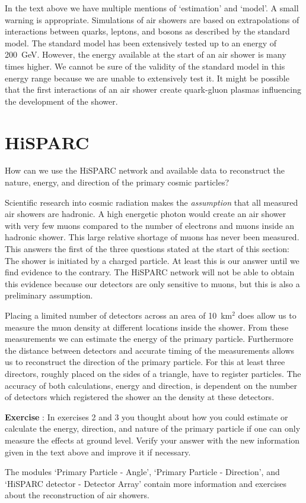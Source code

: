 In the text above we have multiple mentions of `estimation' and `model'. A small warning is appropriate. Simulations of air showers are based on extrapolations of interactions between quarks, leptons, and bosons as described by the standard model. The standard model has been extensively tested up to an energy of 200~GeV. However, the energy available at the start of an air shower is many times higher. We cannot be sure of the validity of the standard model in this energy range because we are unable to extensively test it. It might be possible that the first interactions of an air shower create quark-gluon plasmas influencing the development of the shower.

\section{HiSPARC}
How can we use the HiSPARC network and available data to reconstruct the nature, energy, and direction of the primary cosmic particles?

Scientific research into cosmic radiation makes the \emph{assumption} that all measured air showers are hadronic. A high energetic photon would create an air shower with very few muons compared to the number of electrons and muons inside an hadronic shower. This large relative shortage of muons has never been measured. This answers the first of the three questions stated at the start of this section: The shower is initiated by a charged particle. At least this is our answer until we find evidence to the contrary. The HiSPARC network will not be able to obtain this evidence because our detectors are only sensitive to muons, but this is also a preliminary assumption.

Placing a limited number of detectors across an area of 10~km$^2$ does allow us to measure the muon density at different locations inside the shower. From these measurements we can estimate the energy of the primary particle. Furthermore the distance between detectors and accurate timing of the measurements allows us to reconstruct the direction of the primary particle. For this at least three directors, roughly placed on the sides of a triangle, have to register particles. The accuracy of both calculations, energy and direction, is dependent on the number of detectors which registered the shower an the density at these detectors.

\begin{shaded}
\textbf{Exercise \theExercise {}} : In exercises 2 and 3 you thought about how you could estimate or calculate the energy, direction, and nature of the primary particle if one can only measure the effects at ground level. Verify your answer with the new information given in the text above and improve it if necessary.\end{shaded}

The modules `Primary Particle - Angle', `Primary Particle - Direction', and `HiSPARC detector - Detector Array' contain more information and exercises about the reconstruction of air showers.



